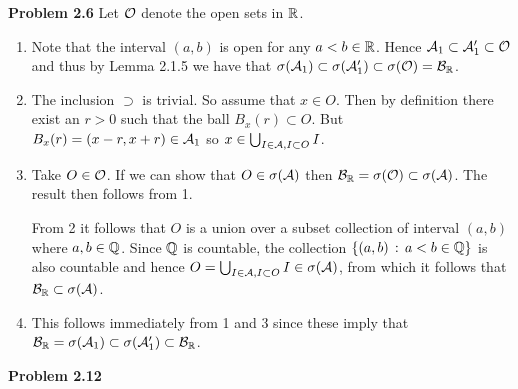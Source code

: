 \documentclass{lecturenotes}
\begin{document}
\textbf{Problem 2.6}
Let $\mathcal O$ denote the open sets in $\mathbb R$.
\begin{enumerate}[label=(\alph*)]
\item Note that the interval $(a,b)$ is open for any $a < b \in \mathbb R$. Hence $\mathcal A_1 \subset \mathcal A_1^\prime \subset \mathcal O$ and thus by Lemma 2.1.5 we have that $\sigma(\mathcal A_1) \subset \sigma(\mathcal A_1^\prime) \subset \sigma(\mathcal O) = \mathcal B_{\mathbb R}$.
\item The inclusion $\supset$ is trivial. So assume that $x \in O$. Then by definition there exist an $r > 0$ such that the ball $B_x(r) \subset O$. But $B_x(r) = (x-r, x+r) \in \mathcal A_1$ so $x \in \bigcup_{I \in \mathcal A, I \subset O} I$.
\item Take $O \in \mathcal O$. If we can show that $O \in \sigma(\mathcal A)$ then $\mathcal B_{\mathbb R} = \sigma(\mathcal O) \subset \sigma(\mathcal A)$. The result then follows from 1. 

From 2 it follows that $O$ is a union over a subset collection of interval $(a,b)$ where $a,b \in \mathbb Q$. Since $\mathbb Q$ is countable, the collection $\{(a,b) \, : \, a < b \in \mathbb Q\}$ is also countable and hence $O = \bigcup_{I \in \mathcal A, I \subset O} I \in \sigma(\mathcal A)$, from which it follows that $\mathcal B_{\mathbb R} \subset \sigma(\mathcal A)$.
\item This follows immediately from 1 and 3 since these imply that $\mathcal B_{\mathbb R} = \sigma(\mathcal A_1) \subset \sigma(\mathcal A_1^\prime) \subset \mathcal B_{\mathbb R}$.
\end{enumerate}

\bigskip

\textbf{Problem 2.12}
\end{document}
